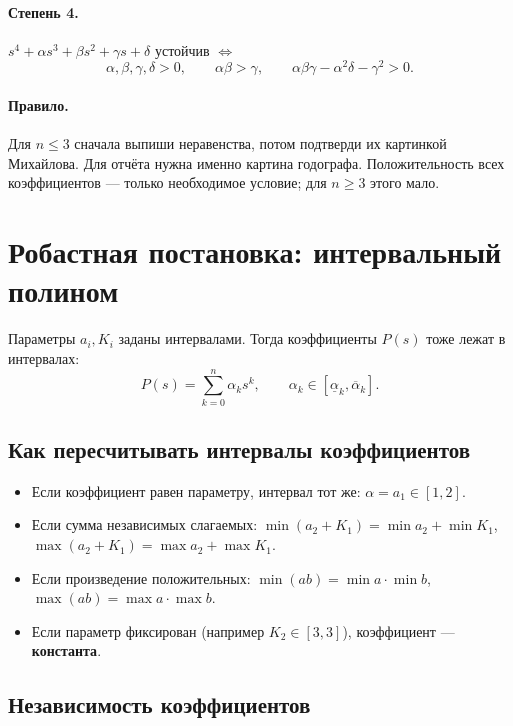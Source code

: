 \documentclass[11pt,a4paper]{article}
\begin{document}
\paragraph{Степень 4.}
\(s^4+\alpha s^3+\beta s^2+\gamma s+\delta\) устойчив \(\Leftrightarrow\)
\[
\alpha,\beta,\gamma,\delta>0,\qquad
\alpha\beta>\gamma,\qquad
\alpha\beta\gamma-\alpha^2\delta-\gamma^2>0.
\]

\paragraph{Правило.}
Для \(n\le 3\) сначала выпиши неравенства, потом подтверди их картинкой Михайлова.
Для отчёта нужна именно картина годографа.
Положительность всех коэффициентов --- только необходимое условие; для \(n\ge 3\) этого мало.

\section{Робастная постановка: интервальный полином}

Параметры \(a_i,K_i\) заданы интервалами. Тогда коэффициенты \(P(s)\) тоже лежат в интервалах:
\[
P(s)=\sum_{k=0}^{n}\alpha_k s^k,\qquad
\alpha_k\in[\underline{\alpha}_k,\overline{\alpha}_k].
\]

\subsection{Как пересчитывать интервалы коэффициентов}

\begin{itemize}
  \item Если коэффициент равен параметру, интервал тот же:
        \(\alpha=a_1\in[1,2]\).
  \item Если сумма независимых слагаемых:
        \(\min(a_2+K_1)=\min a_2+\min K_1\),
        \(\max(a_2+K_1)=\max a_2+\max K_1\).
  \item Если произведение положительных:
        \(\min(ab)=\min a\cdot\min b\),
        \(\max(ab)=\max a\cdot\max b\).
  \item Если параметр фиксирован (например \(K_2\in[3,3]\)), коэффициент --- \textbf{константа}.
\end{itemize}

\subsection{Независимость коэффициентов}
\end{document}
